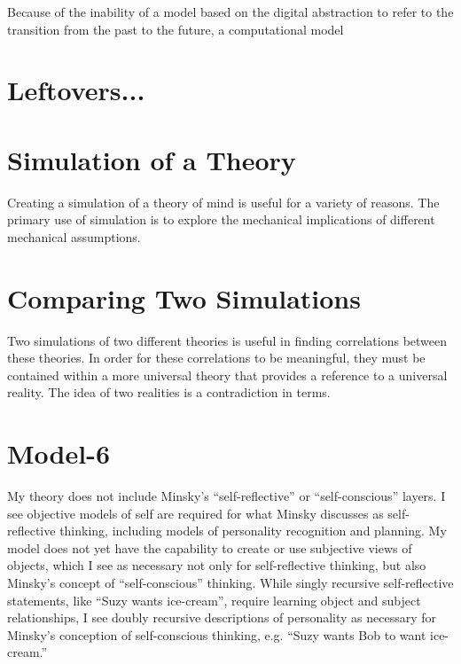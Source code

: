 Because of the inability of a model based on the digital abstraction
to refer to the transition from the past to the future, a
computational model

\section{Leftovers...}

\section{Simulation of a Theory}

Creating a simulation of a theory of mind is useful for a variety of
reasons.  The primary use of simulation is to explore the mechanical
implications of different mechanical assumptions.

\section{Comparing Two Simulations}

Two simulations of two different theories is useful in finding
correlations between these theories.  In order for these correlations
to be meaningful, they must be contained within a more universal
theory that provides a reference to a universal reality.  The idea of
two realities is a contradiction in terms.


\section{Model-6}

My theory does not include Minsky's ``self-reflective'' or
``self-conscious'' layers.  I see objective models of self are
required for what Minsky discusses as self-reflective thinking,
including models of personality recognition and planning.  My model
does not yet have the capability to create or use subjective views of
objects, which I see as necessary not only for self-reflective
thinking, but also Minsky's concept of ``self-conscious'' thinking.
While singly recursive self-reflective statements, like ``Suzy wants
ice-cream'', require learning object and subject relationships, I see
doubly recursive descriptions of personality as necessary for Minsky's
conception of self-conscious thinking, e.g. ``Suzy wants Bob to want
ice-cream.''

